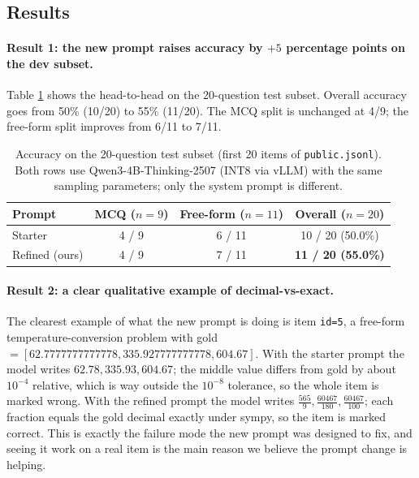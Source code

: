 \documentclass{article}
\begin{document}
\subsection{Results}
\label{sec:results}

\paragraph{Result 1: the new prompt raises accuracy by $+5$ percentage points on the dev subset.}
Table \ref{tab:dev-subset} shows the head-to-head on the 20-question
test subset. Overall accuracy goes from 50\% (10/20) to 55\%
(11/20). The MCQ split is unchanged at 4/9; the free-form split
improves from 6/11 to 7/11.

\begin{table}[h]
  \caption{Accuracy on the 20-question test subset (first 20 items
  of \texttt{public.jsonl}). Both rows use Qwen3-4B-Thinking-2507
  (INT8 via vLLM) with the same sampling parameters; only the system
  prompt is different.}
  \label{tab:dev-subset}
  \centering
  \begin{tabular}{lccc}
    \toprule
    Prompt          & MCQ ($n=9$) & Free-form ($n=11$) & Overall ($n=20$) \\
    \midrule
    Starter         & 4 / 9         & 6 / 11               & 10 / 20 \;(50.0\%) \\
    Refined (ours)  & 4 / 9         & 7 / 11               & \textbf{11 / 20 \;(55.0\%)} \\
    \bottomrule
  \end{tabular}
\end{table}

\paragraph{Result 2: a clear qualitative example of decimal-vs-exact.}
The clearest example of what the new prompt is doing is item
\texttt{id=5}, a free-form temperature-conversion problem with gold
$=[62.7777777777778,335.927777777778,604.67]$. With the starter
prompt the model writes
$\boxed{62.78,335.93,604.67}$; the middle value differs from
gold by about $10^{-4}$ relative, which is way outside the
$10^{-8}$ tolerance, so the whole item is marked wrong. With the
refined prompt the model writes
$\boxed{\tfrac{565}{9},\tfrac{60467}{180},\tfrac{60467}{100}}$;
each fraction equals the gold decimal exactly under sympy, so the
item is marked correct. This is exactly the failure mode the new
prompt was designed to fix, and seeing it work on a real item is
the main reason we believe the prompt change is helping.
\end{document}

